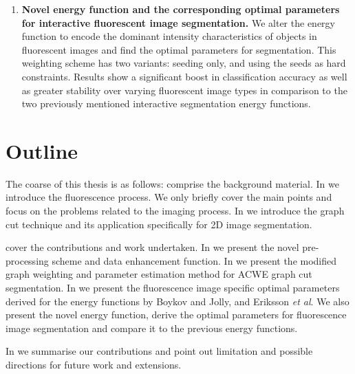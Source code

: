 \begin{enumerate}
	\item
	\textbf{Novel energy function and the corresponding optimal parameters for interactive fluorescent image segmentation.}
	We alter the energy function to encode the dominant intensity characteristics of objects in fluorescent images and find the optimal parameters for segmentation. This weighting scheme has two variants: seeding only, and using the seeds as hard constraints. Results show a significant boost in classification accuracy as well as greater stability over varying fluorescent image types in comparison to the two previously mentioned interactive segmentation energy functions. 
\end{enumerate}


\section{Outline}


The coarse of this thesis is as follows:
 comprise the background material.
In  we introduce the fluorescence process. We only briefly cover the main points  and focus on the problems related to the imaging process.
In  we introduce the graph cut technique and its application specifically for 2D image segmentation.

 cover the contributions and work undertaken.
In  we present the novel pre-processing scheme and data enhancement function.
In  we present the modified graph weighting and parameter estimation method for ACWE graph cut segmentation.
In  we present the fluorescence image specific optimal parameters derived for the energy functions by Boykov and Jolly, and Eriksson \textit{et al}. We also present the novel energy function, derive the optimal parameters for fluorescence image segmentation and compare it to the previous energy functions.

In  we summarise our contributions and point out limitation and possible directions for future work and extensions.